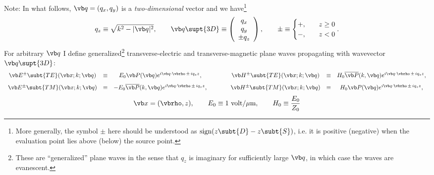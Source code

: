 \documentclass[letterpaper]{article}
\begin{document}
Note: In what follows,
$\vb q=(q_x,q_y)$ is a \textit{two-dimensional} vector and we
have\footnote{More generally, the symbol $\pm$ here should be understood
as $\text{sign}(z\subt{D} - z\subt{S})$, i.e. it is positive (negative) when the evaluation 
point lies above (below) the source point.}
$$ q_z \equiv \sqrt{k^2 - |\vb q|^2}, 
   \qquad
   \vb q\supt{3D}\equiv
   \left(\begin{array}{c}q_x \\ q_y \\ \pm q_z \end{array}\right), 
   \qquad
   \pm \equiv
   \begin{cases}
     +, \quad & z\ge 0 \\ 
     -, \quad & z<   0
   \end{cases}.
$$
For arbitrary $\vb q$ I define generalized\footnote{These 
are ``generalized'' plane waves in the sense that $q_z$ is 
imaginary for sufficiently large $\vb q$, in which case the 
waves are evanescent.} transverse-electric and
transverse-magnetic plane waves propagating with wavevector
$\vb q\supt{3D}$:
$$\begin{array}{ccccccc}
 \vb E^{\pm} \subt{TE}(\vb x; k; \vb q)
   &\equiv& E_0 \vb P(\vb q) e^{i\vb q \cdot \vbrho \, \pm \, iq_z z},
   &\qquad&
 \vb H^{\pm} \subt{TE}(\vb x; k; \vb q)
   &\equiv& H_0 \overline{\vb P}(k, \vb q) e^{i\vb q \cdot \vbrho \, \pm \, iq_z z},
\\[8pt]
 \vb E^{\pm} \subt{TM}(\vb x; k; \vb q)
   &\equiv& -E_0 \overline{\vb P}(k,\vb q) e^{i\vb q \cdot \vbrho \, \pm \, iq_z z},
   &\qquad&
 \vb H^{\pm} \subt{TM}(\vb x; k; \vb q)
   &\equiv& H_0 \vb P(\vb q) e^{i\vb q \cdot \vbrho \, \pm \, iq_z z},
\end{array}$$
$$ \vb x=(\vbrho, z),
   \qquad
   E_0 \equiv 1 \text{ volt/$\mu$m}, \qquad H_0\equiv \frac{E_0}{Z_0}
$$
\end{document}
